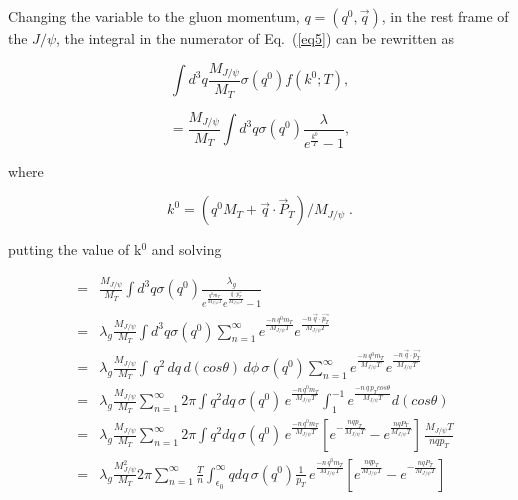 \documentclass[aps,prc,preprint,superscriptaddress,showpacs,showkeys]{revtex4-1}
\begin{document}
Changing the variable to the gluon momentum, $q=(q^0,\vec{q})$, in
the rest frame of the $J/\psi$, the integral in the numerator
of Eq.~(\ref{eq5}) can be rewritten as

\begin{equation}
  \int d^3q \frac{M_{J/\psi}}{M_T}\sigma(q^0) f(k^0;T), \label{eq8}
\end{equation}

\begin{equation} 
=\frac{M_{J/\psi}}{M_T} \int d^3q \sigma(q^0) \frac{\lambda}{e^{\frac{k^0}{T}}-1}, 
\label{eq11}
\end{equation}

where

\begin{equation}
  k^0=(q^0M_T+\vec{q}\cdot\vec{P}_T)/M_{J/\psi} \; . \label{eq9}
\end{equation}

putting the value of k$^{0}$ and solving

\begin{eqnarray} 
&= &\frac{M_{J/\psi}}{M_T} \int d^3q \sigma(q^0) \frac{\lambda_{g}} {  e^{ \frac{q^0m_{T}}{M_{J/\psi}T}} e^{ \frac{ \vec{q}\cdot \vec{p_{T} } }{ M_{J/\psi}T }  } -1}  \\
&= &\lambda_{g} \frac{M_{J/\psi}}{M_T} \int d^3q \sigma(q^0)   \sum_{n=1}^{\infty}  e^{ \frac{-n\,q^0m_{T}}{M_{J/\psi}T}} e^{  \frac{-n\,\vec{q}\cdot \vec{p_{T}}}{M_{J/\psi}T}}\\
&= &\lambda_{g} \frac{M_{J/\psi}}{M_T} \int\,q^2\,dq\,d(cos\theta)\,d\phi\,\sigma(q^0) \sum_{n=1}^{\infty}  e^{ \frac{-n\,q^0m_{T}}{M_{J/\psi}T}} e^{  \frac{-n\,\vec{q}\cdot \vec{p_{T}}}{M_{J/\psi}T}}\\
&= &\lambda_{g} \frac{M_{J/\psi}}{M_T}  \sum_{n=1}^{\infty} 2\pi  \int q^2 dq \, \sigma(q^0)\,e^{ \frac{-n\,q^0m_{T}}{M_{J/\psi}T}}  \int_{1}^{-1} e^{  \frac{-n\,q\,p_{T} cos\theta}{M_{J/\psi}T}} d(cos\theta)\\
&= &\lambda_{g} \frac{M_{J/\psi}}{M_T} \sum_{n=1}^{\infty} 2\pi  \int q^2 dq \, \sigma(q^0)\,e^{ \frac{-n\,q^0 m_{T}}{M_{J/\psi}T}} 
    [e^{-\frac{nq p_T}{M_{J/\psi}T}} - e^{\frac{nq P_T}{M_{J/\psi}T}}]\,\frac{M_{J/\psi}T}{nq p_T}\\
&= &\lambda_{g} \frac{M_{J/\psi}^2}{M_T} 2\pi \sum_{n=1}^{\infty} \frac{T}{n} \int_{\epsilon_0}^{\infty} q dq \, \sigma(q^0) \frac{1}{p_T} \,e^{ \frac{-n\,q^0 m_{T}}{M_{J/\psi}T}} 
    [e^{\frac{n q p_T}{M_{J/\psi}T}} - e^{- \frac{n q P_T}{M_{J/\psi}T}}]\\
\end{eqnarray}
\end{document}
